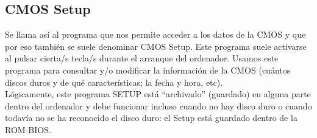 	\subsection{CMOS Setup}\label{sub:cmos setup}
	
		Se llama así al programa que nos permite acceder a los datos de la CMOS
		y que por eso también se suele denominar CMOS Setup. Este programa
		suele activarse al pulsar cierta/s tecla/s durante el arranque del
		ordenador. Usamos este programa para consultar y/o modificar la
		información de la CMOS (cuántos discos duros y de qué características;
		la fecha y hora, etc). \\
		Lógicamente, este programa SETUP está ``archivado'' (guardado) en
		alguna parte dentro del ordenador y debe funcionar incluso cuando no
		hay disco duro o cuando todavía no se ha reconocido el disco duro: el
		Setup está guardado dentro de la ROM-BIOS.  

	\newpage
